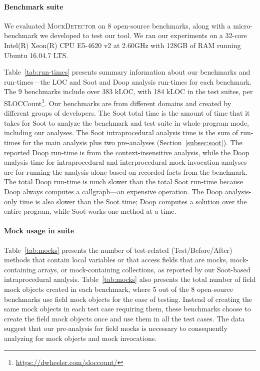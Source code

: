 \paragraph{Benchmark suite} We evaluated \textsc{MockDetector} on 8 open-source benchmarks, along with a micro-benchmark we developed to test our tool. We ran our experiments on a 32-core Intel(R) Xeon(R) CPU E5-4620 v2 at 2.60GHz with 128GB of RAM running Ubuntu 16.04.7 LTS.

Table~\ref{tab:run-times} presents summary information about our benchmarks and run-times---the LOC and Soot and Doop analysis run-times for each benchmark. The 9 benchmarks include over 383 kLOC, with 184 kLOC in the test suites, per SLOCCount\footnote{\url{https://dwheeler.com/sloccount/}}.  Our benchmarks are from different domains and created by different groups of developers. The Soot total time is the amount of time that it takes for Soot to analyze the benchmark and test suite in whole-program mode, including our analyses. The Soot intraprocedural analysis time is the sum of run-times for the main analysis plus two pre-analyses (Section~\ref{subsec:soot}). The reported Doop run-time is from the context-insensitive analysis, while the Doop analysis time for intraprocedural and interprocedural mock invocation analyses are for running the analysis alone based on recorded facts from the benchmark. The total Doop run-time is much slower than the total Soot run-time because Doop always computes a callgraph---an expensive operation. The Doop analysis-only time is also slower than the Soot time; Doop computes a solution over the entire program, while Soot works one method at a time.

\paragraph{Mock usage in suite} Table~\ref{tab:mocks} presents the number of test-related (Test/Before/After) methods that contain local variables or that access fields that are mocks, mock-containing arrays, or mock-containing collections, as reported by our Soot-based intraprocedural analysis. Table~\ref{tab:mocks} also presents the total number of field mock objects created in each benchmark, where 5 out of the 8 open-source benchmarks use field mock objects for the ease of testing. Instead of creating the same mock objects in each test case requiring them, these benchmarks choose to create the field mock objects once and use them in all the test cases. The data suggest that our pre-analysis for field mocks is necessary to consequently analyzing for mock objects and mock invocations.


